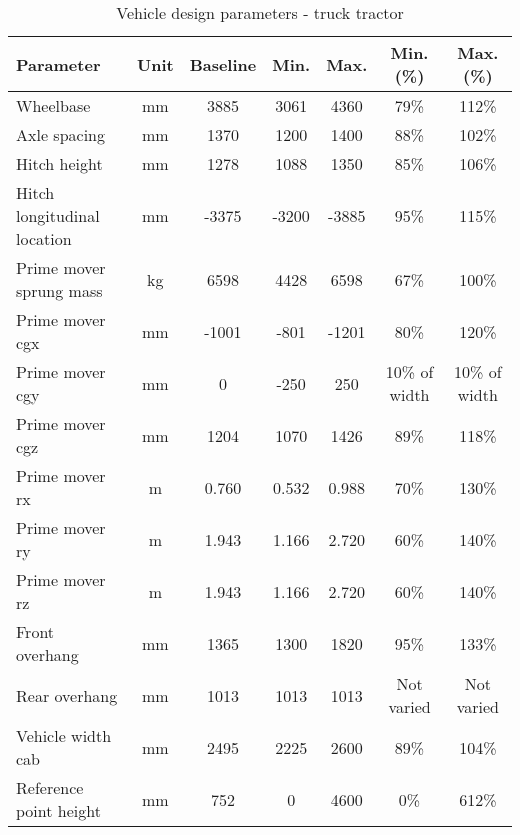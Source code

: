 \begin{table}[H]
	\centering\footnotesize
	\begin{threeparttable}

		\begin{tabulary}{\textwidth}{lcccccc}
			\toprule
			\textbf{Parameter} & \textbf{Unit} & \textbf{Baseline} & \textbf{Min.} & \textbf{Max.} & \textbf{Min. (\%)} & \textbf{Max. (\%)} \\

			\midrule
			Wheelbase & mm    & 3885  & 3061  & 4360  & 79\%  & 112\% \\
			Axle spacing & mm    & 1370  & 1200  & 1400  & 88\%  & 102\% \\
			Hitch height & mm    & 1278  & 1088  & 1350  & 85\%  & 106\% \\
			Hitch longitudinal location & mm    & -3375  & -3200  & -3885  & 95\%  & 115\% \\
			Prime mover sprung mass & kg    & 6598  & 4428  & 6598  & 67\%  & 100\% \\
			Prime mover \gls{cgx} & mm    & -1001  & -801   & -1201  & 80\%  & 120\% \\
			Prime mover \gls{cgy} & mm    & 0     & -250   & 250   & 10\% of width & 10\% of width \\
			Prime mover \gls{cgz} & mm    & 1204  & 1070  & 1426  & 89\%  & 118\% \\
			Prime mover \gls{rx} & m     & 0.760 & 0.532 & 0.988 & 70\%  & 130\% \\
			Prime mover \gls{ry} & m     & 1.943 & 1.166 & 2.720 & 60\%  & 140\% \\
			Prime mover \gls{rz} & m     & 1.943 & 1.166 & 2.720 & 60\%  & 140\% \\
			Front overhang & mm    & 1365  & 1300  & 1820  & 95\%  & 133\% \\
			Rear overhang & mm    & 1013  & 1013  & 1013  & Not varied & Not varied \\
			Vehicle width cab & mm    & 2495  & 2225  & 2600  & 89\%  & 104\% \\
			Reference point height & mm    & 752   & 0     & 4600  & 0\%   & 612\% \\

			\bottomrule
		\end{tabulary}

		\caption{Vehicle design parameters - truck tractor}
		\label{table:vdp-range-prime-mover-tractor}


	\end{threeparttable}
\end{table}

